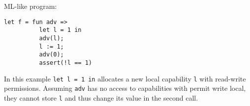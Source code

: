 \documentclass[a4paper]{article}
\newcommand{\update}[2]{[#1 \mapsto #2]}
\newcommand\lau[1]{{\color{purple} \sf \footnotesize {LS: #1}}\\}
\renewcommand\lau[1]{}
\newcommand{\var}[1]{\mathit{#1}}
\newcommand{\hs}{\var{ms}}
\newcommand{\ms}{\hs}
\newcommand{\pcreg}{\mathrm{pc}}
\newcommand{\reg}{\var{reg}}
\newcommand{\heap}{\var{mem}}
\newcommand{\adv}{\var{adv}}
\newcommand{\stk}{\var{stk}}
\newcommand{\flag}{\var{flag}}
\newcommand{\sta}{\var{sta}}
\newcommand{\plainfun}[2]{
  \ifthenelse{\equal{#2}{}}
  {\mathit{#1}}
  {\mathit{#1}(#2)}
}
\newcommand{\revokeTemp}[1]{\plainfun{revokeTemp}{#1}}
\newcommand{\futurestr}{\mathbin{\sqsupseteq}^{\var{priv}}}
\newcommand{\heapSat}[3][\heap]{#1 :_{#2} #3}
\newcommand{\observations}{\mathcal{O}}
\newcommand{\npair}[2][n]{\left(#1,#2 \right)}
\newcommand{\plainview}[1]{\mathrm{#1}}
\newcommand{\perma}{\plainview{perm}}
\begin{document}
\begin{comment}
      All in all, there are no changes to the memory, so we can conclude
      \[
        m'' = \ms' \uplus \ms_f
      \]
      From Lemma~\ref{lem:priv-mono-like}, we can get $\ms''$ and $\ms_r$ such that
      \begin{itemize}
      \item $\ms' = \ms'' \uplus \ms_r$
      \item $\heapSat[\ms'']{n}{\revokeTemp{W}}$
      \end{itemize}
      Now downwards closure of memory segment satisfaction gives us the desired result.
    \item case $r\not\in \{\pcreg,r_0,r_1,r_\stk\}$: $\reg_0(r) = 0$. Trivial.
    \end{enumproof}
  \end{enumproof}
  From \ref{lem:f2-adv-er}, \ref{lem:f2-mem-sat}, and \ref{lem:f2-reg-rel} it follows that
  \[
    \npair{(\reg_0\update{r_0}{c_{\var{prp}}}\update{r_1}{c_\adv}\update{r_\stk}{c_\stk''}\update{\pcreg}{c_\adv},\ms)} \in \observations(W)
  \]
  Now using $i$, the number of steps we need to halt, $\ms_f$ as the frame, $m'$ as the resulting memory and the assumption that the execution terminates successfully gives $W' \futurestr W$, $\ms'$, and $\ms_r$ such that
  \begin{itemize}
  \item $m' = \ms' \uplus\ms_r \uplus \ms_f$
  \item $\heapSat[\ms']{n-i}{W'}$
  \end{itemize}
  The permanent region $\iota^\sta (\perma,\ms_\flag)$ ensures that $\ms_\flag$ is unchanged, so
  \[
    m'(\flag) = 0
  \]
\end{proof}
\end{comment}
\lau{I have skipped the following program in favour of the one in the next section. }
              ML-like program:
\begin{verbatim}
let f = fun adv =>
          let l = 1 in
          adv(l);
          l := 1;
          adv(0);
          assert(!l == 1)
\end{verbatim}
              In this example \texttt{let l = 1 in} allocates a new local capability \texttt{l} with read-write permissions. Assuming \texttt{adv} has no access to capabilities with permit write local, they cannot store \texttt{l} and thus change its value in the second call.
\end{document}
